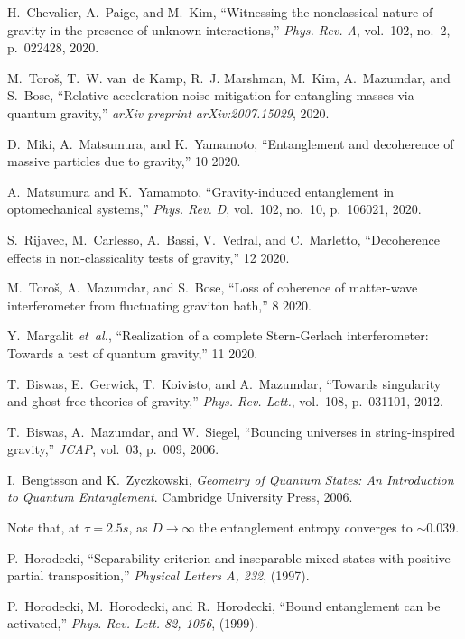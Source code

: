 \documentclass[%
 reprint,
 superscriptaddress,
 amsmath,
 amssymb,
 aps,
 longbibliography
]{revtex4-2}
\begin{document}
\begin{thebibliography}{10}
H.~Chevalier, A.~Paige, and M.~Kim, ``{Witnessing the nonclassical nature of
  gravity in the presence of unknown interactions},'' {\em Phys. Rev. A},
  vol.~102, no.~2, p.~022428, 2020.

M.~Toro{\v{s}}, T.~W. van~de Kamp, R.~J. Marshman, M.~Kim, A.~Mazumdar, and
  S.~Bose, ``Relative acceleration noise mitigation for entangling masses via
  quantum gravity,'' {\em arXiv preprint arXiv:2007.15029}, 2020.

D.~Miki, A.~Matsumura, and K.~Yamamoto, ``{Entanglement and decoherence of
  massive particles due to gravity},'' 10 2020.

A.~Matsumura and K.~Yamamoto, ``{Gravity-induced entanglement in optomechanical
  systems},'' {\em Phys. Rev. D}, vol.~102, no.~10, p.~106021, 2020.

S.~Rijavec, M.~Carlesso, A.~Bassi, V.~Vedral, and C.~Marletto, ``{Decoherence
  effects in non-classicality tests of gravity},'' 12 2020.

M.~Toro\v{s}, A.~Mazumdar, and S.~Bose, ``{Loss of coherence of matter-wave
  interferometer from fluctuating graviton bath},'' 8 2020.

Y.~Margalit {\em et~al.}, ``{Realization of a complete Stern-Gerlach
  interferometer: Towards a test of quantum gravity},'' 11 2020.

T.~Biswas, E.~Gerwick, T.~Koivisto, and A.~Mazumdar, ``{Towards singularity and
  ghost free theories of gravity},'' {\em Phys. Rev. Lett.}, vol.~108,
  p.~031101, 2012.

T.~Biswas, A.~Mazumdar, and W.~Siegel, ``{Bouncing universes in string-inspired
  gravity},'' {\em JCAP}, vol.~03, p.~009, 2006.

I.~Bengtsson and K.~Zyczkowski, {\em Geometry of Quantum States: An
  Introduction to Quantum Entanglement}.
\newblock Cambridge University Press, 2006.

Note that, at $\tau =2.5s$, as $D \to \infty $ the entanglement entropy
  converges to $\sim 0.039$.

P.~Horodecki, ``Separability criterion and inseparable mixed states with
  positive partial transposition,'' {\em Physical Letters A, 232}, (1997).

P.~Horodecki, M.~Horodecki, and R.~Horodecki, ``Bound entanglement can be
  activated,'' {\em Phys. Rev. Lett. 82, 1056}, (1999).


\end{thebibliography}
\end{document}
